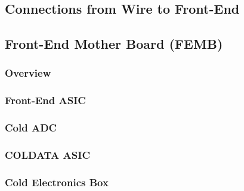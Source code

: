 \subsection{Connections from Wire to Front-End}
\label{sec:fdsp-tpc-elec-design-bias}


\subsection{Front-End Mother Board (FEMB)}
\label{sec:fdsp-tpc-elec-design-femb}


\subsubsection{Overview}
\label{sec:fdsp-tpc-elec-design-femb-ov}


\subsubsection{Front-End ASIC}
\label{sec:fdsp-tpc-elec-design-femb-fe}


\subsubsection{Cold ADC}
\label{sec:fdsp-tpc-elec-design-femb-adc}


\subsubsection{COLDATA ASIC}
\label{sec:fdsp-tpc-elec-design-femb-coldata}


\subsubsection{Cold Electronics Box}
\label{sec:fdsp-tpc-elec-design-femb-box}


